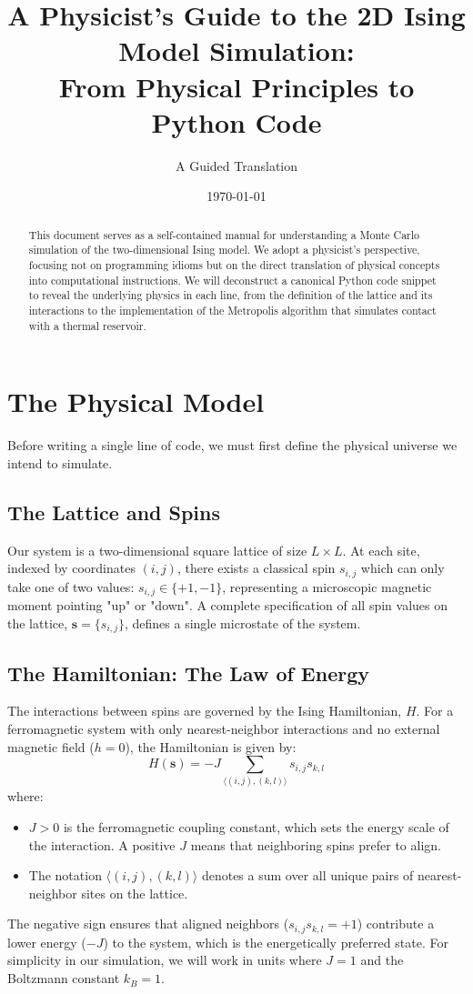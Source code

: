 \documentclass[10pt, letterpaper]{article}
\title{A Physicist's Guide to the 2D Ising Model Simulation: \\ From Physical Principles to Python Code}
\author{A Guided Translation}
\date{\today}
\begin{document}
\maketitle

\begin{abstract}
This document serves as a self-contained manual for understanding a Monte Carlo simulation of the two-dimensional Ising model. We adopt a physicist's perspective, focusing not on programming idioms but on the direct translation of physical concepts into computational instructions. We will deconstruct a canonical Python code snippet to reveal the underlying physics in each line, from the definition of the lattice and its interactions to the implementation of the Metropolis algorithm that simulates contact with a thermal reservoir.
\end{abstract}

\section{The Physical Model}

Before writing a single line of code, we must first define the physical universe we intend to simulate.

\subsection{The Lattice and Spins}
Our system is a two-dimensional square lattice of size $L \times L$. At each site, indexed by coordinates $(i, j)$, there exists a classical spin $s_{i,j}$ which can only take one of two values: $s_{i,j} \in \{+1, -1\}$, representing a microscopic magnetic moment pointing "up" or "down". A complete specification of all spin values on the lattice, $\mathbf{s} = \{s_{i,j}\}$, defines a single microstate of the system.

\subsection{The Hamiltonian: The Law of Energy}
The interactions between spins are governed by the Ising Hamiltonian, $H$. For a ferromagnetic system with only nearest-neighbor interactions and no external magnetic field ($h=0$), the Hamiltonian is given by:
$$
H(\mathbf{s}) = -J \sum_{\langle (i,j), (k,l) \rangle} s_{i,j} s_{k,l}
$$
where:
\begin{itemize}
    \item $J > 0$ is the ferromagnetic coupling constant, which sets the energy scale of the interaction. A positive $J$ means that neighboring spins prefer to align.
    \item The notation $\langle (i,j), (k,l) \rangle$ denotes a sum over all unique pairs of nearest-neighbor sites on the lattice.
\end{itemize}
The negative sign ensures that aligned neighbors ($s_{i,j}s_{k,l}=+1$) contribute a lower energy ($-J$) to the system, which is the energetically preferred state. For simplicity in our simulation, we will work in units where $J=1$ and the Boltzmann constant $k_B=1$.
\end{document}
